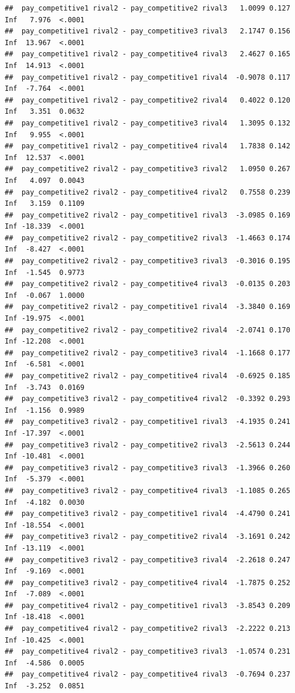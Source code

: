 \documentclass[
]{article}
\begin{document}
\begin{verbatim}
##  pay_competitive1 rival2 - pay_competitive2 rival3   1.0099 0.127 Inf   7.976  <.0001
##  pay_competitive1 rival2 - pay_competitive3 rival3   2.1747 0.156 Inf  13.967  <.0001
##  pay_competitive1 rival2 - pay_competitive4 rival3   2.4627 0.165 Inf  14.913  <.0001
##  pay_competitive1 rival2 - pay_competitive1 rival4  -0.9078 0.117 Inf  -7.764  <.0001
##  pay_competitive1 rival2 - pay_competitive2 rival4   0.4022 0.120 Inf   3.351  0.0632
##  pay_competitive1 rival2 - pay_competitive3 rival4   1.3095 0.132 Inf   9.955  <.0001
##  pay_competitive1 rival2 - pay_competitive4 rival4   1.7838 0.142 Inf  12.537  <.0001
##  pay_competitive2 rival2 - pay_competitive3 rival2   1.0950 0.267 Inf   4.097  0.0043
##  pay_competitive2 rival2 - pay_competitive4 rival2   0.7558 0.239 Inf   3.159  0.1109
##  pay_competitive2 rival2 - pay_competitive1 rival3  -3.0985 0.169 Inf -18.339  <.0001
##  pay_competitive2 rival2 - pay_competitive2 rival3  -1.4663 0.174 Inf  -8.427  <.0001
##  pay_competitive2 rival2 - pay_competitive3 rival3  -0.3016 0.195 Inf  -1.545  0.9773
##  pay_competitive2 rival2 - pay_competitive4 rival3  -0.0135 0.203 Inf  -0.067  1.0000
##  pay_competitive2 rival2 - pay_competitive1 rival4  -3.3840 0.169 Inf -19.975  <.0001
##  pay_competitive2 rival2 - pay_competitive2 rival4  -2.0741 0.170 Inf -12.208  <.0001
##  pay_competitive2 rival2 - pay_competitive3 rival4  -1.1668 0.177 Inf  -6.581  <.0001
##  pay_competitive2 rival2 - pay_competitive4 rival4  -0.6925 0.185 Inf  -3.743  0.0169
##  pay_competitive3 rival2 - pay_competitive4 rival2  -0.3392 0.293 Inf  -1.156  0.9989
##  pay_competitive3 rival2 - pay_competitive1 rival3  -4.1935 0.241 Inf -17.397  <.0001
##  pay_competitive3 rival2 - pay_competitive2 rival3  -2.5613 0.244 Inf -10.481  <.0001
##  pay_competitive3 rival2 - pay_competitive3 rival3  -1.3966 0.260 Inf  -5.379  <.0001
##  pay_competitive3 rival2 - pay_competitive4 rival3  -1.1085 0.265 Inf  -4.182  0.0030
##  pay_competitive3 rival2 - pay_competitive1 rival4  -4.4790 0.241 Inf -18.554  <.0001
##  pay_competitive3 rival2 - pay_competitive2 rival4  -3.1691 0.242 Inf -13.119  <.0001
##  pay_competitive3 rival2 - pay_competitive3 rival4  -2.2618 0.247 Inf  -9.169  <.0001
##  pay_competitive3 rival2 - pay_competitive4 rival4  -1.7875 0.252 Inf  -7.089  <.0001
##  pay_competitive4 rival2 - pay_competitive1 rival3  -3.8543 0.209 Inf -18.418  <.0001
##  pay_competitive4 rival2 - pay_competitive2 rival3  -2.2222 0.213 Inf -10.425  <.0001
##  pay_competitive4 rival2 - pay_competitive3 rival3  -1.0574 0.231 Inf  -4.586  0.0005
##  pay_competitive4 rival2 - pay_competitive4 rival3  -0.7694 0.237 Inf  -3.252  0.0851

\end{verbatim}
\end{document}
